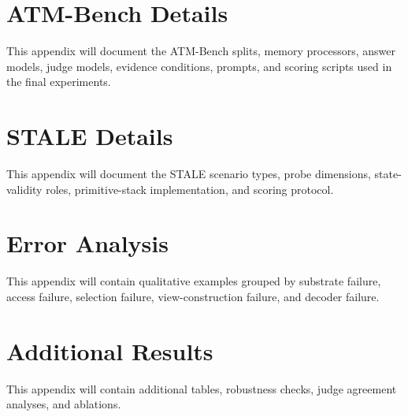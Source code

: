 \section{ATM-Bench Details}
\label{app:sec:atm-details}

This appendix will document the ATM-Bench splits, memory processors, answer models, judge models, evidence conditions, prompts, and scoring scripts used in the final experiments.

\section{STALE Details}
\label{app:sec:stale-details}

This appendix will document the STALE scenario types, probe dimensions, state-validity roles, primitive-stack implementation, and scoring protocol.

\section{Error Analysis}
\label{app:sec:error-analysis}

This appendix will contain qualitative examples grouped by substrate failure, access failure, selection failure, view-construction failure, and decoder failure.

\section{Additional Results}
\label{app:sec:additional-results}

This appendix will contain additional tables, robustness checks, judge agreement analyses, and ablations.
